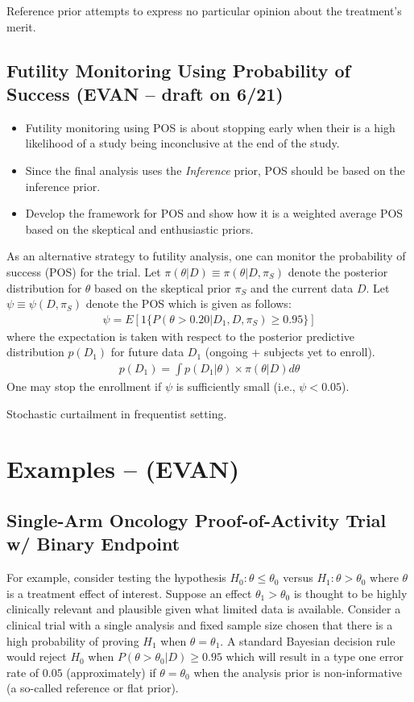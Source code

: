 \documentclass[12pt]{article}
\begin{document}
Reference prior attempts to express no particular opinion about the treatment's merit. 



\subsection{Futility Monitoring Using Probability of Success (EVAN -- draft on 6/21)}

\begin{itemize}
 \item Futility monitoring using POS is about stopping early when their is a high likelihood
       of a study being inconclusive at the end of the study.
 \item Since the final analysis uses the \textit{Inference} prior, POS should be based on the
       inference prior.
 \item Develop the framework for POS and show how it is a weighted average POS based on the skeptical
       and enthusiastic priors.
\end{itemize}
As an alternative strategy to futility analysis, one can monitor the probability of success (POS) for the trial. Let $\pi(\theta|D)\equiv \pi(\theta|D, \pi_{S})$ denote the posterior distribution for $\theta$ based on the skeptical prior $ \pi_{S}$ and the current data $D$. Let $\psi\equiv\psi(D, \pi_{S})$ denote the POS which is given as follows:
\begin{align*}
\psi=E[1\{P(\theta>0.20|D_1,D, \pi_{S})\geq 0.95\}]
\end{align*}
where the expectation is taken with respect to the posterior predictive distribution $p(D_1)$ for future data $D_1$ (ongoing + subjects yet to enroll).
\begin{align*}
p(D_1)=\int p(D_1|\theta)\times \pi(\theta|D)d\theta
\end{align*}
One may stop the enrollment if $\psi$ is sufficiently small (i.e., $\psi<0.05$).

Stochastic curtailment in frequentist setting.
\section{Examples -- (EVAN)}

\subsection{Single-Arm Oncology Proof-of-Activity Trial w/ Binary Endpoint}
For example, consider testing the hypothesis $H_0:\theta\leq\theta_0$ versus $H_1:\theta>\theta_0$ where $\theta$ is a treatment effect of interest. Suppose an effect $\theta_1>\theta_0$ is thought to be highly clinically relevant and plausible given what limited data is available. Consider a clinical trial with a single analysis and fixed sample size chosen that there is a high probability of proving $H_1$ when $\theta=\theta_1$. A standard Bayesian decision rule would reject $H_0$ when $P(\theta>\theta_0|D)\geq 0.95$ which will result in a type one error rate of $0.05$ (approximately) if $\theta=\theta_0$ when the analysis prior is non-informative (a so-called reference or flat prior).
\end{document}

